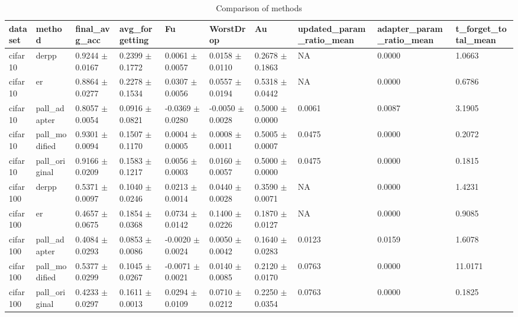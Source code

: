 \begin{table}[t]
\centering
\begin{tabular}{llllllllll}
\hline
dataset & method & final\_avg\_acc & avg\_forgetting & Fu & WorstDrop & Au & updated\_param\_ratio\_mean & adapter\_param\_ratio\_mean & t\_forget\_total\_mean \\
\hline
cifar10 & derpp & 0.9244 $\pm$ 0.0167 & 0.2399 $\pm$ 0.1772 & 0.0061 $\pm$ 0.0057 & 0.0158 $\pm$ 0.0110 & 0.2678 $\pm$ 0.1863 & NA & 0.0000 & 1.0663 \\
cifar10 & er & 0.8864 $\pm$ 0.0277 & 0.2278 $\pm$ 0.1534 & 0.0307 $\pm$ 0.0056 & 0.0557 $\pm$ 0.0194 & 0.5318 $\pm$ 0.0442 & NA & 0.0000 & 0.6786 \\
cifar10 & pall\_adapter & 0.8057 $\pm$ 0.0054 & 0.0916 $\pm$ 0.0821 & -0.0369 $\pm$ 0.0280 & -0.0050 $\pm$ 0.0028 & 0.5000 $\pm$ 0.0000 & 0.0061 & 0.0087 & 3.1905 \\
cifar10 & pall\_modified & 0.9301 $\pm$ 0.0094 & 0.1507 $\pm$ 0.1170 & 0.0004 $\pm$ 0.0005 & 0.0008 $\pm$ 0.0011 & 0.5005 $\pm$ 0.0007 & 0.0475 & 0.0000 & 0.2072 \\
cifar10 & pall\_original & 0.9166 $\pm$ 0.0209 & 0.1583 $\pm$ 0.1217 & 0.0056 $\pm$ 0.0003 & 0.0160 $\pm$ 0.0057 & 0.5000 $\pm$ 0.0000 & 0.0475 & 0.0000 & 0.1815 \\
cifar100 & derpp & 0.5371 $\pm$ 0.0097 & 0.1040 $\pm$ 0.0246 & 0.0213 $\pm$ 0.0014 & 0.0440 $\pm$ 0.0028 & 0.3590 $\pm$ 0.0071 & NA & 0.0000 & 1.4231 \\
cifar100 & er & 0.4657 $\pm$ 0.0675 & 0.1854 $\pm$ 0.0368 & 0.0734 $\pm$ 0.0142 & 0.1400 $\pm$ 0.0226 & 0.1870 $\pm$ 0.0127 & NA & 0.0000 & 0.9085 \\
cifar100 & pall\_adapter & 0.4084 $\pm$ 0.0293 & 0.0853 $\pm$ 0.0086 & -0.0020 $\pm$ 0.0024 & 0.0050 $\pm$ 0.0042 & 0.1640 $\pm$ 0.0283 & 0.0123 & 0.0159 & 1.6078 \\
cifar100 & pall\_modified & 0.5377 $\pm$ 0.0299 & 0.1045 $\pm$ 0.0267 & -0.0071 $\pm$ 0.0021 & 0.0140 $\pm$ 0.0085 & 0.2120 $\pm$ 0.0170 & 0.0763 & 0.0000 & 11.0171 \\
cifar100 & pall\_original & 0.4233 $\pm$ 0.0297 & 0.1611 $\pm$ 0.0013 & 0.0294 $\pm$ 0.0109 & 0.0710 $\pm$ 0.0212 & 0.2250 $\pm$ 0.0354 & 0.0763 & 0.0000 & 0.1825 \\
\hline
\end{tabular}
\caption{Comparison of methods}
\label{tab:results}
\end{table}
